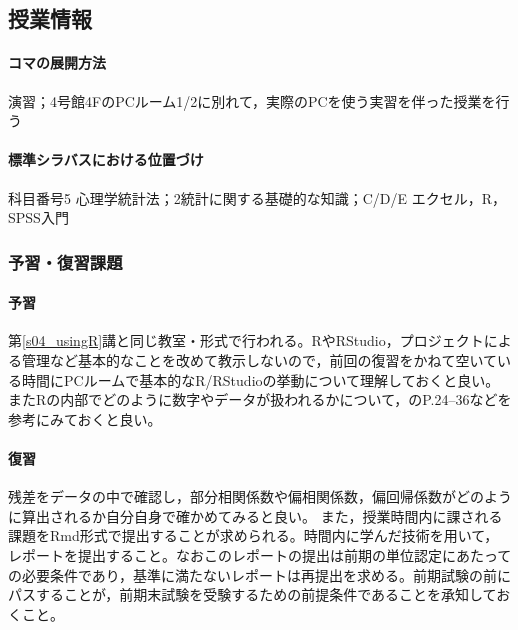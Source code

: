 \subsection{授業情報}
\paragraph{コマの展開方法}
演習；4号館4FのPCルーム1/2に別れて，実際のPCを使う実習を伴った授業を行う
\paragraph{標準シラバスにおける位置づけ}
科目番号5 心理学統計法；2統計に関する基礎的な知識；C/D/E エクセル，R，SPSS入門
\subsubsection{予習・復習課題}
\paragraph{予習}
第\ref{s04_usingR}講と同じ教室・形式で行われる。RやRStudio，プロジェクトによる管理など基本的なことを改めて教示しないので，前回の復習をかねて空いている時間にPCルームで基本的なR/RStudioの挙動について理解しておくと良い。またRの内部でどのように数字やデータが扱われるかについて，\citet{kosugi2019}のP.24--36などを参考にみておくと良い。
\paragraph{復習}
残差をデータの中で確認し，部分相関係数や偏相関係数，偏回帰係数がどのように算出されるか自分自身で確かめてみると良い。
また，授業時間内に課される課題をRmd形式で提出することが求められる。時間内に学んだ技術を用いて，レポートを提出すること。なおこのレポートの提出は前期の単位認定にあたっての必要条件であり，基準に満たないレポートは再提出を求める。前期試験の前にパスすることが，前期末試験を受験するための前提条件であることを承知しておくこと。

